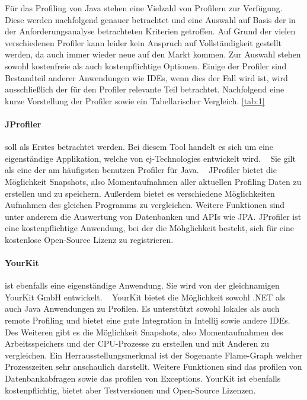 \documentclass[a4paper,12pt]{scrreprt}
\begin{document}

Für das Profiling von Java stehen eine Vielzahl von Profilern zur Verfügung. ~\cite{Website:1} Diese werden nachfolgend genauer betrachtet und eine Auswahl auf Basis der in der Anforderungsanalyse betrachteten Kriterien getroffen.
Auf Grund der vielen verschiedenen Profiler kann leider kein Anspruch auf Vollständigkeit gestellt werden, da auch immer wieder neue auf den Markt kommen. Zur Auswahl stehen sowohl kostenfreie als auch kostenpflichtige Optionen. Einige der Profiler sind Bestandteil anderer Anwendungen wie IDEs, wenn dies der Fall wird ist, wird ausschließlich der für den Profiler relevante Teil betrachtet. Nachfolgend eine kurze Vorstellung der Profiler sowie ein Tabellarischer Vergleich. \ref{tab:1}

\paragraph{JProfiler}

soll als Erstes betrachtet werden. Bei diesem Tool handelt es sich um eine eigenständige Applikation, welche von ej-Technologies entwickelt wird. ~\cite{WEBSITE:2} Sie gilt als eine der am häufigsten benutzen Profiler für Java. ~\cite{WEBSITE:3} JProfiler bietet die Möglichkeit Snapshots, also Momentaufnahmen aller aktuellen Profiling Daten zu erstellen und zu speichern. Außerdem bietet es verschiedene Möglichkeiten Aufnahmen des gleichen Programms zu vergleichen. Weitere Funktionen sind unter anderem die Auswertung von Datenbanken und APIs wie JPA. JProfiler ist eine kostenpflichtige Anwendung, bei der die Möhglichkeit besteht, sich für eine kostenlose Open-Source Lizenz zu registrieren.

\paragraph{YourKit}
ist ebenfalls eine eigenständige Anwendung. Sie wird von der gleichnamigen YourKit GmbH entwickelt. ~\cite{WEBSITE:4} YourKit bietet die Möglichkeit sowohl .NET als auch Java Anwendungen zu Profilen. Es unterstützt sowohl lokales als auch remote Profiling und bietet eine gute Integration in Intellij sowie andere IDEs. Des Weiteren gibt es die Möglichkeit Snapshots, also Momentaufnahmen des Arbeitsspeichers und der CPU-Prozesse zu erstellen und mit Anderen zu vergleichen. Ein Herrausstellungsmerkmal ist der Sogenante Flame-Graph welcher Prozesszeiten sehr anschaulich darstellt. Weitere Funktionen sind das profilen von Datenbankabfragen sowie das profilen von Exceptions. YourKit ist ebenfalls kostenpflichtig, bietet aber Testversionen und Open-Source Lizenzen.
\end{document}
